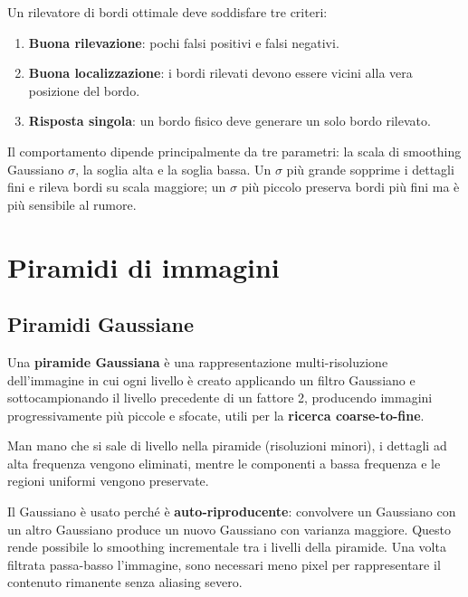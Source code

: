 \documentclass[12pt, a4paper]{report}
\begin{document}
\begin{propbox}
Un rilevatore di bordi ottimale deve soddisfare tre criteri:
\begin{enumerate}
  \item \textbf{Buona rilevazione}: pochi falsi positivi e falsi negativi.
  \item \textbf{Buona localizzazione}: i bordi rilevati devono essere vicini alla
        vera posizione del bordo.
  \item \textbf{Risposta singola}: un bordo fisico deve generare un solo bordo
        rilevato.
\end{enumerate}
Il comportamento dipende principalmente da tre parametri: la scala di smoothing
Gaussiano $\sigma$, la soglia alta e la soglia bassa.  Un $\sigma$ più grande
sopprime i dettagli fini e rileva bordi su scala maggiore; un $\sigma$ più piccolo
preserva bordi più fini ma è più sensibile al rumore.
\end{propbox}

\chapter{Piramidi di immagini}

\section{Piramidi Gaussiane}

\begin{defbox}
Una \textbf{piramide Gaussiana} è una rappresentazione multi-risoluzione
dell'immagine in cui ogni livello è creato applicando un filtro Gaussiano e
sottocampionando il livello precedente di un fattore 2, producendo immagini
progressivamente più piccole e sfocate, utili per la \textbf{ricerca
coarse-to-fine}.
\end{defbox}

Man mano che si sale di livello nella piramide (risoluzioni minori), i dettagli ad
alta frequenza vengono eliminati, mentre le componenti a bassa frequenza e le regioni
uniformi vengono preservate.

\begin{notebox}
Il Gaussiano è usato perché è \textbf{auto-riproducente}: convolvere un Gaussiano
con un altro Gaussiano produce un nuovo Gaussiano con varianza maggiore.  Questo
rende possibile lo smoothing incrementale tra i livelli della piramide.  Una volta
filtrata passa-basso l'immagine, sono necessari meno pixel per rappresentare il
contenuto rimanente senza aliasing severo.
\end{notebox}
\end{document}
